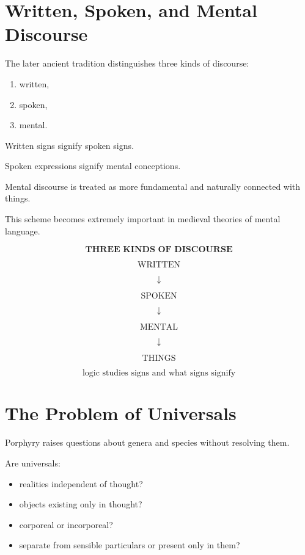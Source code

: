 \documentclass[11pt]{article}
\begin{document}
\section{Written, Spoken, and Mental Discourse}

The later ancient tradition distinguishes three kinds of
discourse:

\begin{enumerate}
    \item written,
    \item spoken,
    \item mental.
\end{enumerate}

Written signs signify spoken signs.

Spoken expressions signify mental conceptions.

Mental discourse is treated as more fundamental and naturally
connected with things.

This scheme becomes extremely important in medieval theories of
mental language.

\begin{whiteboard}
\[
\textbf{THREE KINDS OF DISCOURSE}
\]

\[
\text{WRITTEN}
\]

\[
\downarrow
\]

\[
\text{SPOKEN}
\]

\[
\downarrow
\]

\[
\text{MENTAL}
\]

\[
\downarrow
\]

\[
\text{THINGS}
\]

\[
\boxed{\text{logic studies signs and what signs signify}}
\]
\end{whiteboard}

\section{The Problem of Universals}

Porphyry raises questions about genera and species without
resolving them.

Are universals:

\begin{itemize}
    \item realities independent of thought?
    \item objects existing only in thought?
    \item corporeal or incorporeal?
    \item separate from sensible particulars or present only in them?
\end{itemize}
\end{document}

